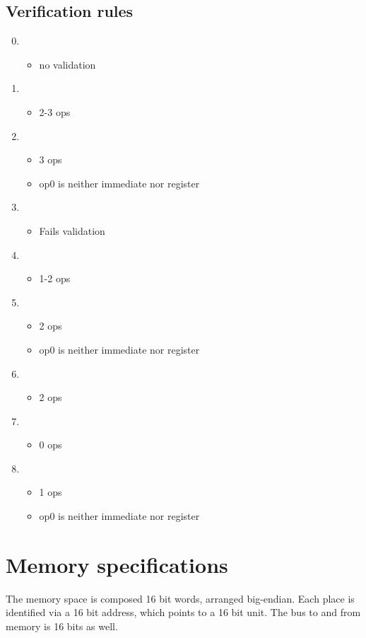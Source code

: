 \documentclass[12pt]{article}
\begin{document}
\subsection{Verification rules}
\begin{enumerate}
\setcounter{enumi}{-1}
\item \begin{itemize} \item no validation \end{itemize}    
\item \begin{itemize} \item 2-3 ops \end{itemize}        
\item \begin{itemize}
    \item 3 ops
    \item op0 is neither immediate nor register        
    \end{itemize}
\item \begin {itemize} \item Fails validation \end{itemize}  
\item \begin {itemize} \item 1-2 ops \end{itemize}
\item \begin {itemize}
     \item 2 ops
     \item op0 is neither immediate nor register
     \end{itemize}
\item \begin {itemize} \item 2 ops \end{itemize}
\item \begin {itemize} \item 0 ops \end{itemize}
\item \begin{itemize}
        \item 1 ops
        \item op0 is neither immediate nor register
      \end{itemize}
\end{enumerate}
\section{Memory specifications}
The memory space is composed 16 bit words, arranged big-endian.
Each place is identified via a 16 bit address, which points to a 16 bit unit.
The bus to and from memory is 16 bits as well.
\end{document}
